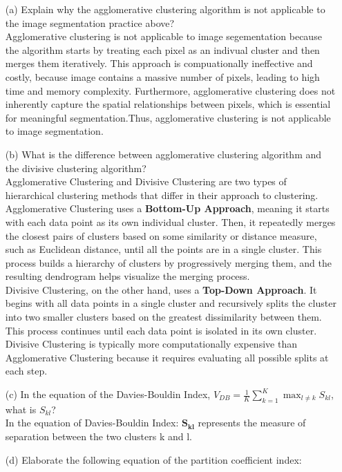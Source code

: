 \documentclass[12pt,letterpaper]{article}
\begin{document}
\begin{itemize}
    \item[(a)] Explain why the agglomerative clustering algorithm is not applicable to the image segmentation practice above?
    \vspace{0.2in}
    \\ Agglomerative clustering is not applicable to image segementation because the algorithm starts by treating each pixel as an indivual 
    cluster and then merges them iteratively. This approach is compuationally ineffective and costly, because image contains a massive number of pixels,
    leading to high time and memory complexity. Furthermore, agglomerative clustering does not inherently capture the spatial relationships between pixels, which is
    essential for meaningful segmentation.Thus, agglomerative clustering is not applicable to image segmentation.

    \item[(b)] What is the difference between agglomerative clustering algorithm and the divisive clustering algorithm?
    \vspace{0.2in}
    \\ Agglomerative Clustering and Divisive Clustering are two types of hierarchical clustering methods that differ in their approach to clustering. Agglomerative Clustering uses a \textbf{Bottom-Up Approach}, meaning it starts with each data point as its own individual cluster. Then, it repeatedly merges the closest pairs of clusters based on some similarity or distance measure, such as Euclidean distance, until all the points are in a single cluster. This process builds a hierarchy of clusters by progressively merging them, and the resulting dendrogram helps visualize the merging process. 
    \vspace{0.2in}
    \\ Divisive Clustering, on the other hand, uses a \textbf{Top-Down Approach}. It begins with all data points in a single cluster and recursively splits the cluster into two smaller clusters based on the greatest dissimilarity between them. This process continues until each data point is isolated in its own cluster. Divisive Clustering is typically more computationally expensive than Agglomerative Clustering because it requires evaluating all possible splits at each step. 
    
    
    \item[(c)] In the equation of the Davies-Bouldin Index, \(V_{DB} = \frac{1}{K}\sum_{k=1}^{K} \max_{l\neq k} S_{kl}\), what is \(S_{kl}\)?
    \vspace{0.2in}
    \\ In the equation of Davies-Bouldin Index: \(\mathbf{S_{kl}}\) represents the measure of separation between the two clusters k and l.
    \item[(d)] Elaborate the following equation of the partition coefficient index:


\end{itemize}
\end{document}
